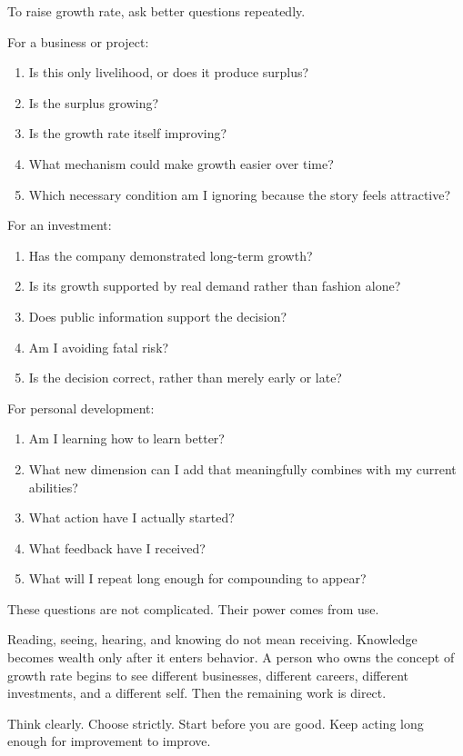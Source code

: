 To raise growth rate, ask better questions repeatedly.

For a business or project:

\begin{enumerate}
\item Is this only livelihood, or does it produce surplus?
\item Is the surplus growing?
\item Is the growth rate itself improving?
\item What mechanism could make growth easier over time?
\item Which necessary condition am I ignoring because the story feels attractive?
\end{enumerate}

For an investment:

\begin{enumerate}
\item Has the company demonstrated long-term growth?
\item Is its growth supported by real demand rather than fashion alone?
\item Does public information support the decision?
\item Am I avoiding fatal risk?
\item Is the decision correct, rather than merely early or late?
\end{enumerate}

For personal development:

\begin{enumerate}
\item Am I learning how to learn better?
\item What new dimension can I add that meaningfully combines with my current abilities?
\item What action have I actually started?
\item What feedback have I received?
\item What will I repeat long enough for compounding to appear?
\end{enumerate}

These questions are not complicated. Their power comes from use.

Reading, seeing, hearing, and knowing do not mean receiving. Knowledge becomes wealth only after it enters behavior. A person who owns the concept of growth rate begins to see different businesses, different careers, different investments, and a different self. Then the remaining work is direct.

Think clearly. Choose strictly. Start before you are good. Keep acting long enough for improvement to improve.
